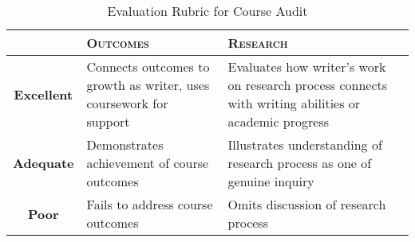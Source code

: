 \documentclass[9pt,twocolumn,oneside]{amsart}	%
\begin{document}
\begin{table}[b]
	\caption{Evaluation Rubric for Course Audit}\label{tab:rubric}
	\small
\begin{tabulary}{\columnwidth}{cLLL}
	\toprule  & \textbf{\textsc{Outcomes}} & \textbf{\textsc{Research}}\\
\midrule	\textbf{Excellent} 
& Connects outcomes to growth as writer, uses coursework for support 
& Evaluates how writer's work on research process connects with writing abilities or academic progress \\
\midrule	\textbf{Adequate} 
& Demonstrates achievement of course outcomes 
& Illustrates understanding of research process as one of genuine inquiry \\
\midrule	\textbf{Poor} 
& Fails to address course outcomes 
& Omits discussion of research process \\
	\bottomrule
\end{tabulary}
\end{table}
\newpage

\end{document}
